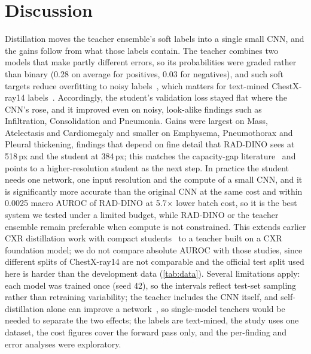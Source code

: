 \documentclass[conference]{IEEEtran}
\begin{document}
\section{Discussion}
\label{sec:discussion}
Distillation moves the teacher ensemble's soft labels into a single small CNN, and the gains follow from what those labels contain. The teacher combines two models that make partly different errors, so its probabilities were graded rather than binary (0.28 on average for positives, 0.03 for negatives), and such soft targets reduce overfitting to noisy labels~\cite{li2017noisy}, which matters for text-mined ChestX-ray14 labels~\cite{oakdenrayner2020exploring}. Accordingly, the student's validation loss stayed flat where the CNN's rose, and it improved even on noisy, look-alike findings such as Infiltration, Consolidation and Pneumonia. Gains were largest on Mass, Atelectasis and Cardiomegaly and smaller on Emphysema, Pneumothorax and Pleural thickening, findings that depend on fine detail that RAD-DINO sees at 518\,px and the student at 384\,px; this matches the capacity-gap literature~\cite{cho2019efficacy,mirzadeh2020teacher} and points to a higher-resolution student as the next step. In practice the student needs one network, one input resolution and the compute of a small CNN, and it is significantly more accurate than the original CNN at the same cost and within 0.0025 macro AUROC of RAD-DINO at 5.7$\times$ lower batch cost, so it is the best system we tested under a limited budget, while RAD-DINO or the teacher ensemble remain preferable when compute is not constrained. This extends earlier CXR distillation work with compact students~\cite{ho2020utilizing,termritthikun2024explainable,kishore2025enhancing} to a teacher built on a CXR foundation model; we do not compare absolute AUROC with those studies, since different splits of ChestX-ray14 are not comparable and the official test split used here is harder than the development data (\cref{tab:data}). Several limitations apply: each model was trained once (seed 42), so the intervals reflect test-set sampling rather than retraining variability; the teacher includes the CNN itself, and self-distillation alone can improve a network~\cite{furlanello2018born}, so single-model teachers would be needed to separate the two effects; the labels are text-mined, the study uses one dataset, the cost figures cover the forward pass only, and the per-finding and error analyses were exploratory.



\end{document}
